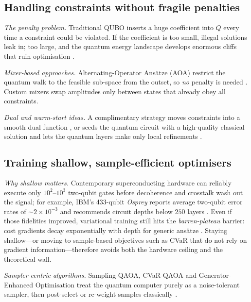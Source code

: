 \subsection{Handling constraints without fragile penalties}

\textit{The penalty problem.}  
Traditional QUBO inserts a huge coefficient into $Q$ every time a
constraint could be violated. If the coefficient is too small, illegal
solutions leak in; too large, and the quantum energy landscape develops
enormous cliffs that ruin optimisation
\cite{kochenberger_unconstrained_2014}.

\textit{Mixer-based approaches.}  
Alternating-Operator Ansätze (AOA) restrict the quantum walk to the
feasible sub-space from the outset, so \emph{no} penalty is needed
\cite{maciejewski_design_2024,fuchs_constrained_2022}.  
Custom mixers swap amplitudes only between states that already obey
all constraints.

\textit{Dual and warm-start ideas.}  
A complimentary strategy moves constraints into a smooth dual function
\cite{gabbassov_lagrangian_2025}, or seeds the quantum circuit with a
high-quality classical solution and lets the quantum layers make only
local refinements \cite{egger_warm-starting_2021}.  


\subsection{Training shallow, sample-efficient optimisers}

\textit{Why shallow matters.}  Contemporary superconducting hardware can
reliably execute only $10^{2}$–$10^{3}$ two-qubit gates before decoherence
and crosstalk wash out the signal; for example, IBM’s 433-qubit
\emph{Osprey} reports average two-qubit error rates of
${\sim}2\times10^{-3}$ and recommends circuit depths below $250$
layers \cite{ibm_heavy_hex_2019,ibm_quantum_volume_2023}.  Even if those
fidelities improved, variational training still hits the
\emph{barren-plateau} barrier: cost gradients decay
exponentially with depth for generic ansätze \cite{cerezo_cost_2021,mcclean_barren_2018}.
Staying shallow—or moving to sample-based objectives such as CVaR that do
not rely on gradient information—therefore avoids both the hardware
ceiling and the theoretical wall.


\textit{Sampler-centric algorithms.}  
Sampling-QAOA, CVaR-QAOA and Generator-Enhanced Optimisation treat the
quantum computer purely as a noise-tolerant sampler, then
post-select or re-weight samples classically
\cite{matsuyama_sampling-based_2025,alcazar_enhancing_2024,barkoutsos_improving_2020}.  

